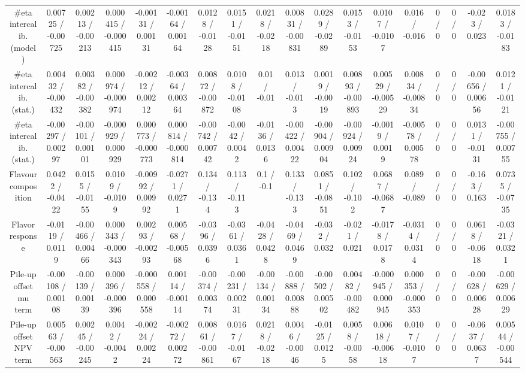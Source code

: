 \documentclass[10pt]{article}
\begin{document}
\begin{table}[htbp]
\begin{center}
\begin{tabular}{|c|c|c|c|c|c|c|c|c|c|c|c|c|c|c|c|c|c|}
  #eta intercalib. (model) & 0.00725 / -0.00725 & 0.00213 / -0.00213 & 0.000415 / -0.000415 & -0.00131 / 0.00131 & -0.00164 / 0.00164 & 0.0128 / -0.0128 & 0.0151 / -0.0151 & 0.0218 / -0.0218 & 0.00831 / -0.00831 & 0.0289 / -0.0289 & 0.0153 / -0.0153 & 0.0107 / -0.0107 & 0.016 / -0.016 & 0 / 0 & 0 / 0 & -0.023 / 0.023 & 0.0183 / -0.0183 \\ 
  #eta intercalib. (stat.) & 0.00432 / -0.00432 & 0.00382 / -0.00382 & 0.000974 / -0.000974 & -0.00212 / 0.00212 & -0.00364 / 0.00364 & 0.00872 / -0.00872 & 0.0108 / -0.0108 & 0.01 / -0.01 & 0.013 / -0.013 & 0.0019 / -0.0019 & 0.00893 / -0.00893 & 0.00529 / -0.00529 & 0.00834 / -0.00834 & 0 / 0 & 0 / 0 & -0.00656 / 0.00656 & 0.0121 / -0.0121 \\ 
  #eta intercalib. (stat.) & -0.00297 / 0.00297 & -0.00101 / 0.00101 & -0.000929 / 0.000929 & 0.000773 / -0.000773 & 0.000814 / -0.000814 & -0.00742 / 0.00742 & -0.0042 / 0.0042 & -0.0136 / 0.0136 & -0.00422 / 0.00422 & -0.00904 / 0.00904 & -0.00924 / 0.00924 & -0.0019 / 0.0019 & -0.00578 / 0.00578 & 0 / 0 & 0 / 0 & 0.0131 / -0.0131 & -0.00755 / 0.00755 \\ 
  Flavour composition & 0.0422 / -0.0422 & 0.0155 / -0.0155 & 0.0109 / -0.0109 & -0.00992 / 0.00992 & -0.0271 / 0.0271 & 0.134 / -0.134 & 0.113 / -0.113 & 0.1 / -0.1 & 0.133 / -0.133 & 0.0851 / -0.0851 & 0.102 / -0.102 & 0.0687 / -0.0687 & 0.089 / -0.089 & 0 / 0 & 0 / 0 & -0.163 / 0.163 & 0.0735 / -0.0735 \\ 
  Flavor response & -0.0119 / 0.0119 & -0.00466 / 0.00466 & 0.000343 / -0.000343 & 0.00293 / -0.00293 & 0.00568 / -0.00568 & -0.0396 / 0.0396 & -0.0361 / 0.0361 & -0.0428 / 0.0428 & -0.0469 / 0.0469 & -0.032 / 0.032 & -0.021 / 0.021 & -0.0178 / 0.0178 & -0.0314 / 0.0314 & 0 / 0 & 0 / 0 & 0.0618 / -0.0618 & -0.0321 / 0.0321 \\ 
  Pile-up offset mu term & -0.00108 / 0.00108 & -0.00139 / 0.00139 & 0.000396 / -0.000396 & -0.000558 / 0.000558 & 0.00114 / -0.00114 & -0.00374 / 0.00374 & -0.00231 / 0.00231 & -0.00134 / 0.00134 & -0.00888 / 0.00888 & -0.00502 / 0.00502 & 0.00482 / -0.00482 & -0.000945 / 0.000945 & 0.000353 / -0.000353 & 0 / 0 & 0 / 0 & -0.00628 / 0.00628 & -0.00629 / 0.00629 \\ 
  Pile-up offset NPV term & 0.00563 / -0.00563 & 0.00245 / -0.00245 & 0.0042 / -0.0042 & -0.00224 / 0.00224 & -0.00272 / 0.00272 & 0.00861 / -0.00861 & 0.0167 / -0.0167 & 0.0218 / -0.0218 & 0.0046 / -0.0046 & -0.0125 / 0.0125 & 0.0058 / -0.0058 & 0.00618 / -0.00618 & 0.0107 / -0.0107 & 0 / 0 & 0 / 0 & -0.0637 / 0.0637 & 0.00544 / -0.00544 \\ 

\end{tabular}
\end{center}
\end{table}
\end{document}
